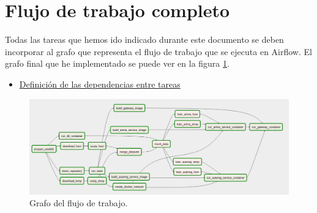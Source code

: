 \section{Flujo de trabajo completo}
Todas las tareas que hemos ido indicado durante este documento se deben
incorporar al grafo que representa el flujo de trabajo que se ejecuta en
Airflow. El grafo final que he implementado se puede ver en la figura
\ref{fig:workflow}.

\begin{itemize}
    \item\href{
        https://github.com/Varrrro/forecast/blob/master/airflow/tasks.py#L210-L224
    }{Definición de las dependencias entre tareas}
\end{itemize}

\begin{figure}[h!]
    \includegraphics[width=\textwidth]{images/workflow.png}
    \caption{Grafo del flujo de trabajo.}
    \label{fig:workflow}
\end{figure}

